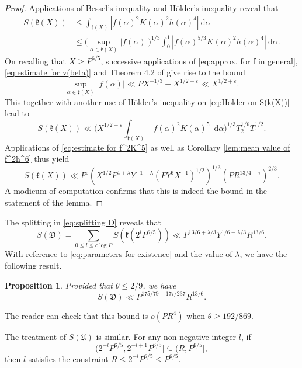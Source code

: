\documentclass[12pt,english,reqno]{amsart}
\theoremstyle{definition}
\theoremstyle{remark}
\numberwithin{equation}{section}
\numberwithin{equation}{section}
\numberwithin{figure}{section}
\theoremstyle{plain}
\theoremstyle{plain}
\newtheorem{prop}[thm]{Proposition}
\theoremstyle{plain}
\theoremstyle{plain}
\numberwithin{equation}{section}
\numberwithin{thm}{section}
\begin{document}
\begin{proof}
Applications of Bessel's inequality and H\"{o}lder's inequality reveal
that
\begin{align}
S(\mathfrak{k}(X))&\leq\int_{\mathfrak{k}(X)}|f(\alpha)^{2}K(\alpha)^{2}h(\alpha)^{4}|\:\mathrm{d}\alpha\label{eq:Bessel on S(k(X))}\\
&\leq\Big(\sup_{\alpha\in\mathfrak{k}(X)}|f(\alpha)|\Big)^{1/3}\int_{0}^{1}|f(\alpha)^{5/3}K(\alpha)^{2}h(\alpha)^{4}|\:\mathrm{d}\alpha.\label{eq:Holder on S(k(X))}\end{align}
On recalling that $X\geq P^{6/5}$, successive applications of \eqref{eq:approx. for f in general},
\eqref{eq:estimate for v(beta)} and Theorem 4.2 of \cite{vaughan1997}
give rise to the bound
\begin{equation}
\sup_{\alpha\in\mathfrak{k}(X)}|f(\alpha)|\ll PX^{-1/3}+X^{1/2+\varepsilon}\ll X^{1/2+\varepsilon}.\label{eq:estimate for f on k(X)}\end{equation}
This together with another use of H\"{o}lder's inequality on \eqref{eq:Holder on S(k(X))}
lead to
\begin{equation}
S(\mathfrak{k}(X))\ll\Big(X^{1/2+\varepsilon}\int_{\mathfrak{k}(X)}|f(\alpha)^{2}K(\alpha)^{5}|\:\mathrm{d}\alpha\Big)^{1/3}T_{2}^{1/6}T_{1}^{1/2}.\label{eq:Holder on S(k(X))}\end{equation}
Applications of \eqref{eq:estimate for f^2K^5} as well as Corollary
\ref{lem:mean value of f^2h^6} thus yield 
\[
S(\mathfrak{k}(X))\ll P^{\varepsilon}(X^{1/2}P^{4+\lambda}Y^{-1-\lambda}(PY^{3}X^{-1})^{1/2})^{1/3}(PR^{13/4-\tau})^{2/3}.\]
A modicum of computation confirms that this is indeed the bound in the statement of the lemma.
\end{proof}
The splitting in \eqref{eq:splitting D} reveals that
\[
S(\mathfrak{D})=\sum_{0\leq l\leq c\log P}S(\mathfrak{k}(2^{l}P^{6/5}))\ll P^{13/6+\lambda/3}Y^{1/6-\lambda/3}R^{13/6}.\]
With reference to \eqref{eq:parameters for existence} and the value
of $\lambda$, we have the following result.
\begin{prop}
\label{pro:S(D)}Provided that $\theta\leq2/9$, we have
\[
S(\mathfrak{D})\ll P^{175/79-17\tau/237}R^{13/6}.\]
\end{prop}
The reader can check that this bound is $o(PR^4)$ when $\theta\geq192/869$.
\par The treatment of $S(\mathfrak{U})$ is similar. For any non-negative
integer $l$, if 
\[(2^{-l}P^{6/5},2^{-l+1}P^{6/5}]\subseteq(R,P^{6/5}],\]
then $l$ satisfies the constraint $R\leq2^{-l}P^{6/5}\leq P^{6/5}$.
\end{document}
